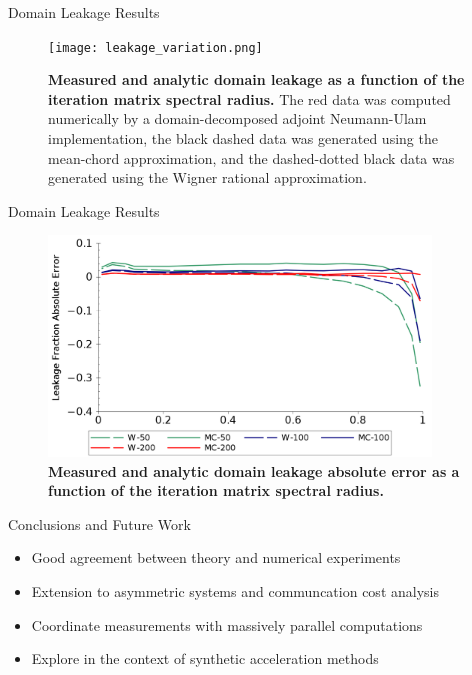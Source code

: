 \documentclass{beamer}
\begin{document}
\begin{frame}{Domain Leakage Results}

  \begin{figure}[t!]
    \begin{center}
      \texttt{[image: leakage\_variation.png]}
    \end{center}
    \caption{\textbf{Measured and analytic domain leakage as a
        function of the iteration matrix spectral radius.} The red
      data was computed numerically by a domain-decomposed adjoint
      Neumann-Ulam implementation, the black dashed data was generated
      using the mean-chord approximation, and the dashed-dotted black
      data was generated using the Wigner rational approximation.}
  \end{figure}

\end{frame}

\begin{frame}{Domain Leakage Results}

  \begin{figure}[ht!]
      \begin{center}
        \includegraphics[width=4.0in,clip]{leakage_error.png}
      \end{center}
      \caption{\textbf{Measured and analytic domain leakage absolute
          error as a function of the iteration matrix spectral radius.}}
  \end{figure}

\end{frame}

\begin{frame}{Conclusions and Future Work}

  \begin{itemize}
  \item Good agreement between theory and numerical experiments
    \bigskip
  \item Extension to asymmetric systems and communcation cost analysis
    \bigskip
  \item Coordinate measurements with massively parallel computations
    \bigskip
  \item Explore in the context of synthetic acceleration methods
  \end{itemize}

\end{frame}
\end{document}
